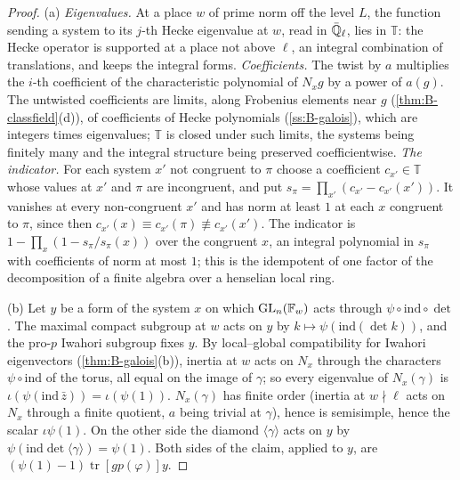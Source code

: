 \begin{proof}
(a) \emph{Eigenvalues.} At a place $w$ of prime norm off the level $L$, the function sending a system to its $j$-th Hecke eigenvalue at $w$, read in $\bar{\mathbb{Q}}_\ell$, lies in $\mathbb T$: the Hecke operator is supported at a place not above $\ell$, an integral
combination of translations, and keeps the integral forms. \emph{Coefficients.} The twist by $a$ multiplies the $i$-th coefficient of the characteristic polynomial of $N_xg$ by a power of $a(g)$. The untwisted coefficients are limits, along
Frobenius elements near $g$ (\cref{thm:B-classfield}(d)), of coefficients of Hecke polynomials (\cref{ss:B-galois}), which are integers times eigenvalues; $\mathbb T$ is closed under such limits, the systems being finitely many and the
integral structure being preserved coefficientwise. \emph{The indicator.} For each system $x'$ not congruent to $\pi$ choose a coefficient $c_{x'}\in\mathbb T$ whose values at $x'$ and $\pi$ are incongruent, and put $s_\pi=\prod_{x'}(c_{x'}-c_{x'}(x'))$.
It vanishes at every non-congruent $x'$ and has norm at least $1$ at each $x$ congruent to $\pi$, since then $c_{x'}(x)\equiv c_{x'}(\pi)\not\equiv c_{x'}(x')$. The indicator is $1-\prod_{x}(1-s_\pi/s_\pi(x))$ over the congruent $x$, an integral polynomial in $s_\pi$ with
coefficients of norm at most $1$; this is the idempotent of one factor of the decomposition of a finite algebra over a henselian local ring.

(b) Let $y$ be a form of the system $x$ on which $\operatorname{GL}_n(\mathbb{F}_w)$ acts through $\psi\circ\mathrm{ind}\circ\det$. The maximal compact subgroup at $w$ acts on $y$ by $k\mapsto\psi(\mathrm{ind}(\det k))$, and the pro-$p$ Iwahori subgroup fixes $y$. By local--global
compatibility for Iwahori eigenvectors (\cref{thm:B-galois}(b)), inertia at $w$ acts on $N_x$ through the characters $\psi\circ\mathrm{ind}$ of the torus, all equal on the image of $\gamma$; so every eigenvalue of $N_x(\gamma)$ is $\iota(\psi(\mathrm{ind}\,\bar z))=\iota(\psi(1))$.
$N_x(\gamma)$ has finite order (inertia at $w\nmid\ell$ acts on $N_x$ through a finite quotient, $a$ being trivial at $\gamma$), hence is semisimple, hence the scalar $\iota\psi(1)$. On the other side the diamond $\langle\gamma\rangle$ acts on $y$ by
$\psi(\mathrm{ind}\det\langle\gamma\rangle)=\psi(1)$. Both sides of the claim, applied to $y$, are $(\psi(1)-1)\operatorname{tr}[gp(\varphi)]y$.


\end{proof}
